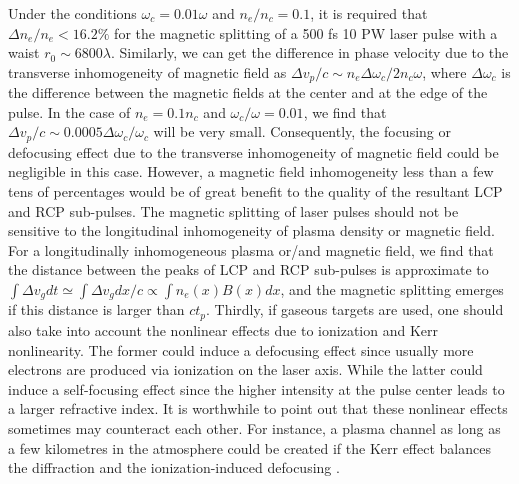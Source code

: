 \documentclass[%
aps,
preprint,
showpacs,
preprintnumbers,
 amsmath,
 amssymb,
 prl,
]{revtex4-1}
\begin{document}
Under the conditions $\omega_c=0.01\omega$ and $n_e/n_c=0.1$,  it is required that $\Delta n_e/n_e<16.2\%$ for the magnetic splitting of a 500 fs 10 PW laser pulse with a waist $r_0 \sim 6800 \lambda$.
Similarly, we can get the difference in phase velocity due to the transverse inhomogeneity of magnetic field as $\Delta v_p/c \sim n_e \Delta \omega_c/2n_c \omega$, where $\Delta \omega_c$ is the difference between the magnetic fields at the center and at the edge of the pulse.
In the case of $n_e=0.1n_c$ and $\omega_c/\omega=0.01$, we find that $\Delta v_p/c \sim 0.0005 \Delta \omega_c/\omega_c $ will be very small. Consequently, the focusing or defocusing effect due to the transverse inhomogeneity of magnetic field could be negligible in this case. However, a magnetic field inhomogeneity less than a few tens of percentages would be of great benefit to the quality of the resultant LCP and RCP sub-pulses.
The magnetic splitting of laser pulses should not be sensitive to the longitudinal inhomogeneity of plasma density or magnetic field. For a  longitudinally inhomogeneous plasma or/and magnetic field, we find that the distance between the peaks of LCP and RCP sub-pulses is approximate to $\int \Delta v_g dt  \simeq \int \Delta v_g dx/c \propto \int n_e(x) B(x) dx$, and the magnetic splitting emerges if this distance is larger than $c t_p$.
Thirdly, if gaseous targets are used, one should also take into account the nonlinear effects due to ionization and Kerr nonlinearity.
The former could induce a defocusing effect since usually more electrons are produced via ionization on the laser axis.
While the latter could induce a self-focusing effect since the higher intensity at the pulse center leads to a larger refractive index.
It is worthwhile to point out that these nonlinear effects sometimes may counteract each other. For instance, a plasma channel as long as a few kilometres in the atmosphere could be created if the Kerr effect balances the diffraction and the ionization-induced defocusing \cite{GibbonBook,Kasparian}.
\end{document}
